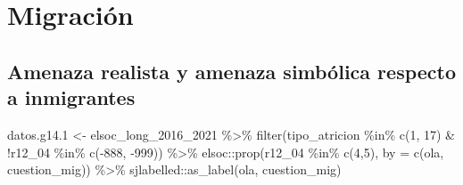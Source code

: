 \documentclass[
  12pt,
]{book}
\newenvironment{Shaded}{\begin{snugshade}}{\end{snugshade}}
\newcommand{\AttributeTok}[1]{\textcolor[rgb]{0.77,0.63,0.00}{#1}}
\newcommand{\DecValTok}[1]{\textcolor[rgb]{0.00,0.00,0.81}{#1}}
\newcommand{\FloatTok}[1]{\textcolor[rgb]{0.00,0.00,0.81}{#1}}
\newcommand{\FunctionTok}[1]{\textcolor[rgb]{0.00,0.00,0.00}{#1}}
\newcommand{\NormalTok}[1]{#1}
\newcommand{\OtherTok}[1]{\textcolor[rgb]{0.56,0.35,0.01}{#1}}
\newcommand{\SpecialCharTok}[1]{\textcolor[rgb]{0.00,0.00,0.00}{#1}}
\begin{document}
\hypertarget{migraciuxf3n}{%
\chapter{Migración}\label{migraciuxf3n}}

\hypertarget{amenaza-realista-y-amenaza-simbuxf3lica-respecto-a-inmigrantes}{%
\section{Amenaza realista y amenaza simbólica respecto a inmigrantes}\label{amenaza-realista-y-amenaza-simbuxf3lica-respecto-a-inmigrantes}}

\begin{Shaded}
\begin{Highlighting}[]
\NormalTok{datos.g14}\FloatTok{.1} \OtherTok{\textless{}{-}}\NormalTok{ elsoc\_long\_2016\_2021 }\SpecialCharTok{\%\textgreater{}\%} 
  \FunctionTok{filter}\NormalTok{(tipo\_atricion }\SpecialCharTok{\%in\%} \FunctionTok{c}\NormalTok{(}\DecValTok{1}\NormalTok{, }\DecValTok{17}\NormalTok{) }\SpecialCharTok{\&} \SpecialCharTok{!}\NormalTok{r12\_04 }\SpecialCharTok{\%in\%} \FunctionTok{c}\NormalTok{(}\SpecialCharTok{{-}}\DecValTok{888}\NormalTok{, }\SpecialCharTok{{-}}\DecValTok{999}\NormalTok{)) }\SpecialCharTok{\%\textgreater{}\%} 
\NormalTok{  elsoc}\SpecialCharTok{::}\FunctionTok{prop}\NormalTok{(r12\_04 }\SpecialCharTok{\%in\%} \FunctionTok{c}\NormalTok{(}\DecValTok{4}\NormalTok{,}\DecValTok{5}\NormalTok{), }\AttributeTok{by =} \FunctionTok{c}\NormalTok{(ola, cuestion\_mig)) }\SpecialCharTok{\%\textgreater{}\%} 
\NormalTok{  sjlabelled}\SpecialCharTok{::}\FunctionTok{as\_label}\NormalTok{(ola, cuestion\_mig)}
  

\end{Highlighting}
\end{Shaded}
\end{document}
